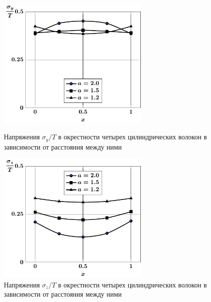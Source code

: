 \begin{russian}
\begin{figure}[h!]
\centering\footnotesize
\parbox[b]{7.5cm}{\centering\includegraphics[width=7.5cm]{inclusion-4-y-a.pdf}
\caption{Напряжения $\sigma_y/T$ в окрестности четырех цилиндрических волокон в зависимости от расстояния между ними
\label{f:7:56}}}\hfil\hfil
\parbox[b]{7.5cm}{\centering\includegraphics[width=7.5cm]{inclusion-4-z-a.pdf}
\caption{Напряжения $\sigma_z/T$ в окрестности четырех цилиндрических волокон в зависимости от расстояния между ними
\label{f:7:57}}}
\end{figure}

%


\end{russian}
